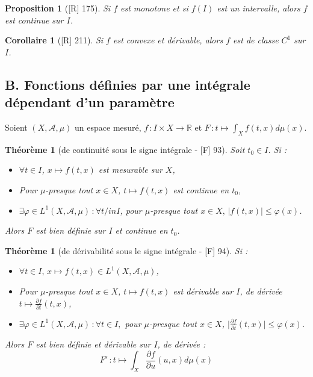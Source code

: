 \documentclass[10pt, a4paper, parskip=full, twoside, twocolumn]{report}
\newtheorem{theorem}[definition]{Théorème}
\newtheorem{proposition}[definition]{Proposition}
\newtheorem{corollary}[definition]{Corollaire}
\newcommand{\IR}{\mathbb{R}}
\newcommand{\A}{\mathscr{A}}
\begin{document}
\begin{proposition}[\textnormal{[R] 175}]
	Si $f$ est monotone et si $f(I)$ est un intervalle, alors $f$ est continue sur $I$.
\end{proposition}

\begin{corollary}[\textnormal{[R] 211}]
	Si $f$ est convexe et dérivable, alors $f$ est de classe $C^1$ sur $I$.
\end{corollary}

\subsection*{B. Fonctions définies par une intégrale dépendant d'un paramètre}
\textcolor{paragraphtext}{Soient $(X,\A,\mu)$ un espace mesuré, $f\,\colon I\times X\to \IR$ et $F\,\colon t\mapsto\int_X f(t,x)d\mu(x)$.}

\begin{theorem}[de continuité sous le signe intégrale - \textnormal{[F] 93}]
	Soit $t_0\in I$. Si :
	\begin{itemize}
		\item $\forall t\in I$, $x\mapsto f(t,x)$ est mesurable sur $X$,
		\item Pour $\mu$-presque tout $x\in X$, $t\mapsto f(t,x)$ est continue en $t_0$,
		\item $\exists \varphi\in L^1(X,\A, \mu)\,\colon \forall t/in I$, pour $\mu$-presque tout $x\in X,\, \vert f(t,x) \vert \leq \varphi(x)$.
	\end{itemize}
	Alors $F$ est bien définie sur $I$ et continue en $t_0$.
\end{theorem}

\begin{theorem}[de dérivabilité sous le signe intégrale - \textnormal{[F] 94}]
	Si :
	\begin{itemize}
		\item $\forall t\in I,\, x\mapsto f(t,x)\in L^1(X,\A, \mu)$,
		\item Pour $\mu$-presque tout $x\in X$, $t\mapsto f(t,x)$ est dérivable sur $I$, de dérivée $t\mapsto \frac{\partial f}{\partial t}(t,x)$,
		\item $\exists \varphi\in L^1(X,\A, \mu)\,\colon \forall t\in I,$ pour $\mu$-presque tout $x\in X$, $\vert \frac{\partial f}{\partial t}(t,x) \vert \leq \varphi(x)$.
	\end{itemize}
	Alors $F$ est bien définie et dérivable sur $I$, de dérivée :
	$$F'\,\colon t\mapsto \int_X \frac{\partial f}{\partial u}(u,x)d\mu(x)$$
\end{theorem}
\end{document}
